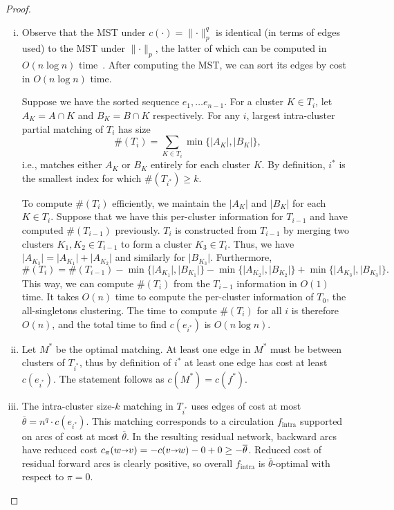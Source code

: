 \documentclass[11pt]{article}
\def\set#1{\{ #1 \}}
\def\abs#1{\mathopen| #1 \mathclose|}		%
\def\norm#1{\mathopen\| #1 \mathclose\|}	%
\def\arcto{\mathord\shortrightarrow}
\def\arc#1#2{#1\arcto#2}
\theoremstyle{plain}
\numberwithin{figure}{section}
\begin{document}
\begin{proof}
\begin{enumerate}[(i)]
\item Observe that the MST under $c(\cdot) = \norm{\cdot}_p^q$ is identical
	(in terms of edges used) to the MST under $\norm{\cdot}_p$, the latter
	of which can be computed in $O(n\log n)$ time~\cite{CD85}.
	After computing the MST, we can sort its edges by cost in $O(n\log n)$ time.

	Suppose we have the sorted sequence $e_1, \ldots e_{n-1}$.
	For a cluster $K \in T_i$, let $A_K = A \cap K$ and $B_K = B \cap K$ respectively.
	For any $i$, largest intra-cluster partial matching of $T_i$ has size
	\[
	\#(T_i) = \sum_{K \in T_i} \min\set{\abs{A_K}, \abs{B_K}},
	\]
	i.e., matches either $A_K$ or $B_K$ entirely for each cluster $K$.
	By definition, $i^*$ is the smallest index for which $\#(T_{i^*}) \geq k$.

	To compute $\#(T_i)$ efficiently, we maintain the $\abs{A_K}$ and
	$\abs{B_K}$ for each $K \in T_i$.
	Suppose that we have this per-cluster information for $T_{i-1}$ and
	have computed $\#(T_{i-1})$ previously.
	$T_i$ is constructed from $T_{i-1}$ by merging two clusters
	$K_1, K_2 \in T_{i-1}$ to form a cluster $K_3 \in T_i$.
	Thus, we have $\abs{A_{K_3}} = \abs{A_{K_1}} + \abs{A_{K_2}}$ and
	similarly for $\abs{B_{K_3}}$.
	Furthermore,
	\[
	\#(T_i) = \#(T_{i-1}) - \min\set{\abs{A_{K_1}}, \abs{B_{K_1}}} - \min\set{\abs{A_{K_2}}, \abs{B_{K_2}}} + \min\set{\abs{A_{K_3}}, \abs{B_{K_3}}}.
	\]
	This way, we can compute $\#(T_i)$ from the $T_{i-1}$ information in $O(1)$ time.
	It takes $O(n)$ time to compute the per-cluster information of $T_0$, the all-singletons clustering.
	The time to compute $\#(T_i)$ for all $i$ is therefore $O(n)$,
	and the total time to find $c(e_{i^*})$ is $O(n\log n)$.
\item Let $M^*$ be the optimal matching.
	At least one edge in $M^*$ must be between clusters of $T_{i^*}$,
	thus by definition of $i^*$ at least one edge has cost at least $c(e_{i^*})$.
	The statement follows as $c(M^*) = c(f^*)$.
\item The intra-cluster size-$k$ matching in $T_{i^*}$ uses edges of cost at most
	$\overline{\theta} = n^q \cdot c(e_{i^*})$.
	This matching corresponds to a circulation $f_\text{intra}$ supported
	on arcs of cost at most $\overline{\theta}$.
	In the resulting residual network, backward arcs have reduced cost
	$c_\pi(\arc wv) = -c(\arc vw) - 0 + 0 \geq -\overline{\theta}$.
	Reduced cost of residual forward arcs is clearly positive, so overall
	$f_\text{intra}$ is $\overline{\theta}$-optimal with respect to $\pi = 0$.
\end{enumerate}
\end{proof}
\end{document}
